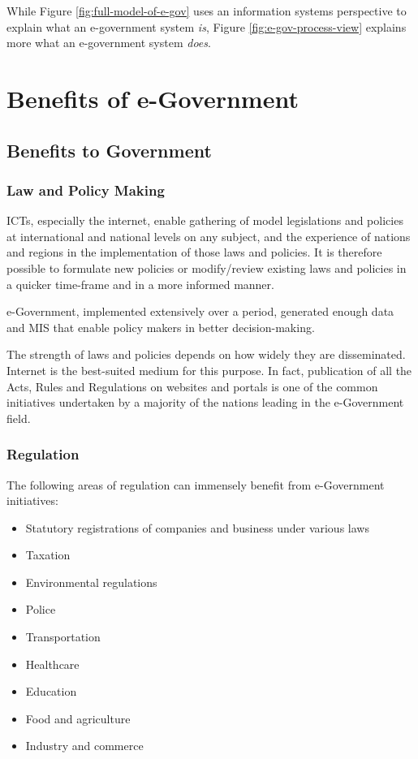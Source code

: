 While Figure \ref{fig:full-model-of-e-gov} uses an information
systems perspective to explain what an
e-government system \textit{is}, Figure \ref{fig:e-gov-process-view} explains
more what an e-government system \textit{does}.


\section{Benefits of e-Government}

\subsection{Benefits to Government}
\subsubsection{Law and Policy Making}
ICTs, especially the internet, enable gathering of model legislations and policies at international and national levels on any subject, and the experience of nations and regions in the implementation of those laws and policies. It is therefore possible to formulate new policies or modify/review existing laws and policies in a quicker time-frame and in a more informed manner.

e-Government, implemented extensively over a period, generated enough data and MIS that enable policy makers in  better decision-making.

The strength of laws and policies depends on how widely they are disseminated. Internet is the best-suited medium for this purpose. In fact, publication of all the Acts, Rules and Regulations on websites and portals is one of the common initiatives undertaken by a majority of the nations leading in the e-Government field.

\subsubsection{Regulation}
The following areas of regulation can immensely benefit from e-Government initiatives:
\begin{multicols}{2}
	\begin{itemize}
		\item Statutory registrations of companies and business under various laws
		\item Taxation
		\item Environmental regulations
		\item Police
		\item Transportation
		\item Healthcare
		\item Education
		\item Food and agriculture
		\item Industry and commerce
	\end{itemize}
\end{multicols}


